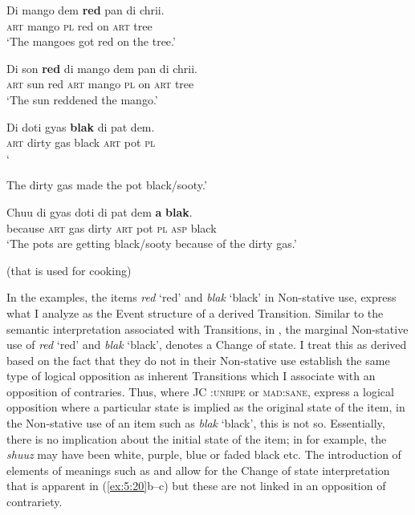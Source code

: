 \ex 
\gll Di mango dem \textbf{red} pan di chrii.\\
\textsc{art} mango {\textsc{pl}} red on \textsc{art} tree\\
\glt `The mangoes got red on the tree.'

\ex 
\gll Di son \textbf{red} di mango dem pan di chrii.\\
\textsc{art} sun red \textsc{art} mango {\textsc{pl}} on \textsc{art} tree\\
\glt `The sun reddened the mango.'
 \z
\z

\ea%
 \label{ex:5:23}
\ea 
\gll Di doti gyas \textbf{blak} di pat dem.\\
\textsc{art} dirty gas black \textsc{art} pot {\textsc{pl}}\\
\glt `{The dirty gas made the pot black/sooty.'

\ex 
\gll Chuu di gyas doti di pat dem \textbf{a} \textbf{blak}.\\
 because \textsc{art} gas dirty \textsc{art} pot {\textsc{pl}} \textsc{asp} black\\
\glt `The pots are getting black\slash sooty because of the dirty gas.'} (that is used for cooking)
 \z
\z

In the examples,  the items \textit{red} `red' and \textit{blak} `black' in Non-stative use, express what I analyze as the Event structure of a derived Transition. Similar to the semantic interpretation associated with Transitions, in , the marginal Non-stative use of \textit{red} `red' and \textit{blak} `black', denotes a Change of state. I treat this as derived based on the fact that they do not in their Non-stative use establish the same type of logical opposition as inherent Transitions which I associate with an opposition of contraries. Thus, where JC \RIPE:\textsc{unripe} or \textsc{mad:sane}, express a logical opposition where a particular state is implied as the original state of the item, in the Non-stative use of an item such as \textit{blak} `black', this is not so. Essentially, there is no implication about the initial state of the item; in  for example, the \textit{shuuz} may have been white, purple, blue or faded black etc. The introduction of elements of meanings such as \BECOME and \CAUSE allow for the Change of state interpretation that is apparent in (\ref{ex:5:20}b--c) but these are not linked in an opposition of contrariety. 

